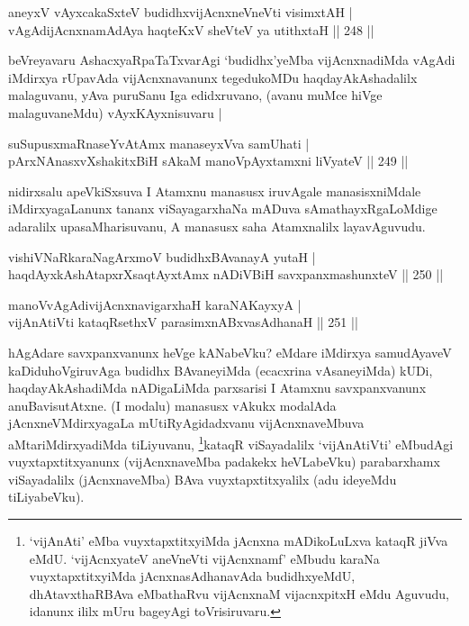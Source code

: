 
\begin{shl}
aneyxV vAyxcakaSxteV budidhxvijAcnxneVneVti visimxtAH |\\
vAgAdijAcnxnamAdAya haqteKxV sheVteV ya utithxtaH \hfill || 248 ||
\end{shl}

\begin{artha}
beVreyavaru AshacxyaRpaTaTxvarAgi `budidhx'yeMba vijAcnxnadiMda vAgAdi iMdirxya rUpavAda vijAcnxnavanunx tegedukoMDu haqdayAkAshadalilx malaguvanu, yAva puruSanu Iga edidxruvano, (avanu muMce hiVge malaguvaneMdu) vAyxKAyxnisuvaru |
\end{artha}


\begin{shl}
suSupusxmaRnaseYvA\s \s tAmx manaseyxVva samUhati |\\
pArxNAnasxvXshakitxBiH sAkaM manoV\s pAyxtamxni liVyateV \hfill || 249 ||
\end{shl}

\begin{artha}
nidirxsalu apeVkiSxsuva I Atamxnu manasusx iruvAgale manasisxniMdale  iMdirxyagaLanunx tananx viSayagarxhaNa mADuva sAmathayxRgaLoMdige adaralilx upasaMharisuvanu, A manasusx saha Atamxnalilx layavAguvudu.
\end{artha}

\begin{shl}
vishiVNaRkaraNagArxmoV budidhxBAvanayA yutaH |\\
haqdAyxkAshAtapxrXsaqtAyxtAmx nADiVBiH savxpanxmashunxteV \hfill || 250 ||
\end{shl}
\begin{shl}
manoVvAgAdivijAcnxnavigarxhaH karaNAKayxyA |\\
vijAnAtiVti kataqRsethxV parasimxnABxvasAdhanaH \hfill || 251 ||
\end{shl}

\begin{artha}
hAgAdare savxpanxvanunx heVge kANabeVku? eMdare  \mdash  iMdirxya samudAyaveV kaDiduhoVgiruvAga budidhx BAvaneyiMda (ecacxrina vAsaneyiMda) kUDi, haqdayAkAshadiMda nADigaLiMda parxsarisi I Atamxnu savxpanxvanunx anuBavisutAtxne. (I modalu) manasusx vAkukx modalAda jAcnxneVMdirxyagaLa mUtiRyAgidadxvanu vijAcnxnaveMbuva aMtariMdirxyadiMda tiLiyuvanu, \footnote{`vijAnAti' eMba vuyxtapxtitxyiMda jAcnxna mADikoLuLxva kataqR jiVva eMdU. `vijAcnxyateV aneVneVti vijAcnxnamf' eMbudu karaNa vuyxtapxtitxyiMda jAcnxnasAdhanavAda budidhxyeMdU, dhAtavxthaRBAva eMbathaRvu vijAcnxnaM vijacnxpitxH eMdu Aguvudu, idanunx ililx mUru bageyAgi toVrisiruvaru.}kataqR viSayadalilx `vijAnAtiVti' eMbudAgi vuyxtapxtitxyanunx (vijAcnxnaveMba padakekx heVLabeVku) parabarxhamx viSayadalilx (jAcnxnaveMba) BAva vuyxtapxtitxyalilx (adu ideyeMdu tiLiyabeVku).
\end{artha}

